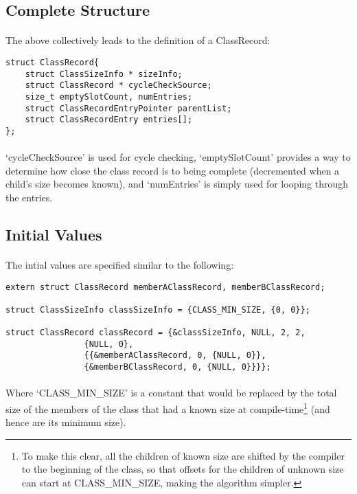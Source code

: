 \documentclass{article}
\begin{document}
\subsection{Complete Structure}

\paragraph{}
The above collectively leads to the definition of a ClassRecord:

\begin{lstlisting}
struct ClassRecord{
	struct ClassSizeInfo * sizeInfo;
	struct ClassRecord * cycleCheckSource;
	size_t emptySlotCount, numEntries;
	struct ClassRecordEntryPointer parentList;
	struct ClassRecordEntry entries[];
};
\end{lstlisting}

\paragraph{}
`cycleCheckSource' is used for cycle checking, `emptySlotCount' provides a way to determine how close the class record is to being complete (decremented when a child's size becomes known), and `numEntries' is simply used for looping through the entries.

\subsection{Initial Values}

\paragraph{}
The intial values are specified similar to the following:

\begin{lstlisting}
extern struct ClassRecord memberAClassRecord, memberBClassRecord;

struct ClassSizeInfo classSizeInfo = {CLASS_MIN_SIZE, {0, 0}};

struct ClassRecord classRecord = {&classSizeInfo, NULL, 2, 2,
				{NULL, 0},
				{{&memberAClassRecord, 0, {NULL, 0}},
				{&memberBClassRecord, 0, {NULL, 0}}}};
\end{lstlisting}

\paragraph{}
Where `CLASS\_MIN\_SIZE' is a constant that would be replaced by the total size of the members of the class that had a known size at compile-time\footnote{To make this clear, all the children of known size are shifted by the compiler to the beginning of the class, so that offsets for the children of unknown size can start at CLASS\_MIN\_SIZE, making the algorithm simpler.} (and hence are its minimum size).
\end{document}
